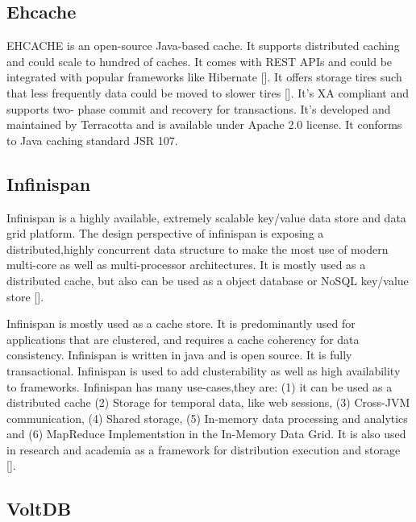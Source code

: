 \subsection{Ehcache}

EHCACHE is an open-source Java-based cache. It supports distributed
caching and could scale to hundred of caches. It comes with REST APIs
and could be integrated with popular frameworks like
Hibernate [\cite{www-ehcache-features}]. It offers storage tires such
that less frequently data could be moved to slower
tires [\cite{www-ehcache-documentation}]. It's XA compliant and supports
two- phase commit and recovery for transactions. It's developed and
maintained by Terracotta and is available under Apache 2.0 license.
It conforms to Java caching standard JSR 107.

\subsection{Infinispan}

Infinispan is a highly available, extremely scalable key/value data
store and data grid platform. The design perspective of infinispan is
exposing a distributed,highly concurrent data structure to make the
most use of modern multi-core as well as multi-processor
architectures. It is mostly used as a distributed cache, but also can
be used as a object database or NoSQL key/value
store [\cite{infinispan.org}].

Infinispan is mostly used as a cache store. It is predominantly used
for applications that are clustered, and requires a cache coherency
for data consistency. Infinispan is written in java and is open
source. It is fully transactional. Infinispan is used to add
clusterability as well as high availability to frameworks.  Infinispan
has many use-cases,they are: (1) it can be used as a distributed cache
(2) Storage for temporal data, like web sessions, (3) Cross-JVM
communication, (4) Shared storage, (5) In-memory data processing and
analytics and (6) MapReduce Implementstion in the In-Memory Data
Grid. It is also used in research and academia as a framework for
distribution execution and storage [\cite{infinispan_wikipedia}].
     
\subsection{VoltDB}

